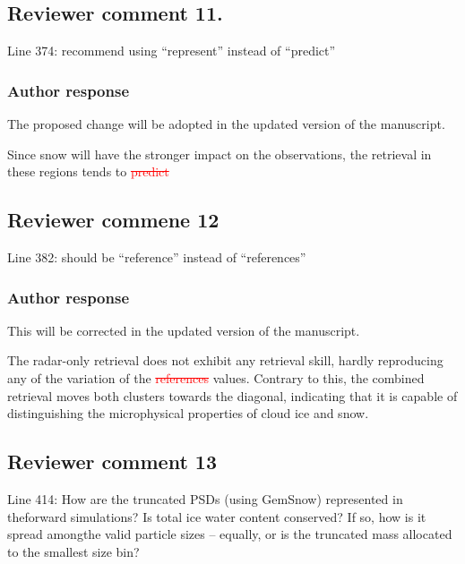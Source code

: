 \documentclass[11pt]{scrartcl}
\providecommand{\DIFadd}[1]{{\protect\textcolor{blue}{\uwave{#1}}}} %
\providecommand{\DIFdel}[1]{{\protect\textcolor{red}{\sout{#1}}}}                      %
\providecommand{\DIFaddbegin}{} %
\providecommand{\DIFaddend}{} %
\providecommand{\DIFdelbegin}{} %
\providecommand{\DIFdelend}{} %
\newenvironment{change}[1][]{%
  \begin{mdframed}[frametitle={Line #1:}]%
}{%
  \end{mdframed}%
}
\begin{document}
\subsection*{Reviewer comment 11.}
 Line 374: recommend using “represent” instead of “predict”

\subsubsection*{Author response}
The proposed change will be adopted in the updated version of the manuscript.

\begin{change}[374]
Since snow will have the
stronger impact on the observations, the retrieval in these regions tends to
\DIFdelbegin \DIFdel{predict }\DIFdelend \DIFaddbegin 
\end{change}

\subsection*{Reviewer commene 12}
 Line 382: should be “reference” instead of “references”


\subsubsection*{Author response}
This will be corrected in the updated version of the manuscript.

 \begin{change}[382]
 The radar-only retrieval does not exhibit any retrieval skill, hardly
 reproducing any of the variation of the \DIFdelbegin \DIFdel{references
 }\DIFdelend \DIFaddbegin \DIFadd{reference }\DIFaddend values. Contrary to
 this, the combined retrieval moves both clusters towards the diagonal,
 indicating that it is capable of distinguishing the microphysical properties of
 cloud ice and snow.
 \end{change}

\subsection*{Reviewer comment 13}

Line  414:  How  are  the  truncated  PSDs  (using  GemSnow)  represented  in  theforward simulations? Is total ice water content conserved? If so, how is it spread amongthe valid particle sizes – equally, or is the truncated mass allocated to the smallest size bin?
\end{document}
